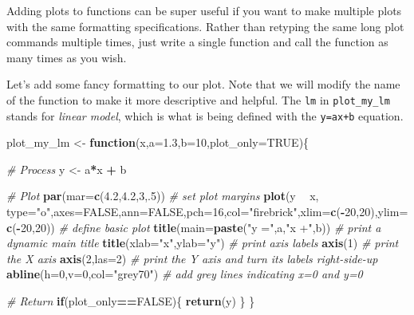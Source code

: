 \documentclass[]{book}
\newenvironment{Shaded}{\begin{snugshade}}{\end{snugshade}}
\newcommand{\CommentTok}[1]{\textcolor[rgb]{0.56,0.35,0.01}{\textit{#1}}}
\newcommand{\ControlFlowTok}[1]{\textcolor[rgb]{0.13,0.29,0.53}{\textbf{#1}}}
\newcommand{\DataTypeTok}[1]{\textcolor[rgb]{0.13,0.29,0.53}{#1}}
\newcommand{\DecValTok}[1]{\textcolor[rgb]{0.00,0.00,0.81}{#1}}
\newcommand{\FloatTok}[1]{\textcolor[rgb]{0.00,0.00,0.81}{#1}}
\newcommand{\KeywordTok}[1]{\textcolor[rgb]{0.13,0.29,0.53}{\textbf{#1}}}
\newcommand{\NormalTok}[1]{#1}
\newcommand{\OperatorTok}[1]{\textcolor[rgb]{0.81,0.36,0.00}{\textbf{#1}}}
\newcommand{\OtherTok}[1]{\textcolor[rgb]{0.56,0.35,0.01}{#1}}
\newcommand{\StringTok}[1]{\textcolor[rgb]{0.31,0.60,0.02}{#1}}
\begin{document}
Adding plots to functions can be super useful if you want to make multiple plots with the same formatting specifications. Rather than retyping the same long plot commands multiple times, just write a single function and call the function as many times as you wish.

Let's add some fancy formatting to our plot. Note that we will modify the name of the function to make it more descriptive and helpful. The \texttt{lm} in \texttt{plot\_my\_lm} stands for \emph{linear model}, which is what is being defined with the \texttt{y=ax+b} equation.

\begin{Shaded}
\begin{Highlighting}[]
\NormalTok{plot_my_lm <-}\StringTok{ }\ControlFlowTok{function}\NormalTok{(x,}\DataTypeTok{a=}\FloatTok{1.3}\NormalTok{,}\DataTypeTok{b=}\DecValTok{10}\NormalTok{,}\DataTypeTok{plot_only=}\OtherTok{TRUE}\NormalTok{)\{}
  
  \CommentTok{# Process}
\NormalTok{  y <-}\StringTok{ }\NormalTok{a}\OperatorTok{*}\NormalTok{x }\OperatorTok{+}\StringTok{ }\NormalTok{b}
  
  \CommentTok{# Plot}
  \KeywordTok{par}\NormalTok{(}\DataTypeTok{mar=}\KeywordTok{c}\NormalTok{(}\FloatTok{4.2}\NormalTok{,}\FloatTok{4.2}\NormalTok{,}\DecValTok{3}\NormalTok{,.}\DecValTok{5}\NormalTok{)) }\CommentTok{# set plot margins}
  \KeywordTok{plot}\NormalTok{(y }\OperatorTok{~}\StringTok{ }\NormalTok{x, }\DataTypeTok{type=}\StringTok{"o"}\NormalTok{,}\DataTypeTok{axes=}\OtherTok{FALSE}\NormalTok{,}\DataTypeTok{ann=}\OtherTok{FALSE}\NormalTok{,}\DataTypeTok{pch=}\DecValTok{16}\NormalTok{,}\DataTypeTok{col=}\StringTok{"firebrick"}\NormalTok{,}\DataTypeTok{xlim=}\KeywordTok{c}\NormalTok{(}\OperatorTok{-}\DecValTok{20}\NormalTok{,}\DecValTok{20}\NormalTok{),}\DataTypeTok{ylim=}\KeywordTok{c}\NormalTok{(}\OperatorTok{-}\DecValTok{20}\NormalTok{,}\DecValTok{20}\NormalTok{)) }\CommentTok{# define basic plot}
  \KeywordTok{title}\NormalTok{(}\DataTypeTok{main=}\KeywordTok{paste}\NormalTok{(}\StringTok{"y ="}\NormalTok{,a,}\StringTok{"x +"}\NormalTok{,b)) }\CommentTok{# print a dynamic main title}
  \KeywordTok{title}\NormalTok{(}\DataTypeTok{xlab=}\StringTok{"x"}\NormalTok{,}\DataTypeTok{ylab=}\StringTok{"y"}\NormalTok{)  }\CommentTok{# print axis labels}
  \KeywordTok{axis}\NormalTok{(}\DecValTok{1}\NormalTok{) }\CommentTok{# print the X axis}
  \KeywordTok{axis}\NormalTok{(}\DecValTok{2}\NormalTok{,}\DataTypeTok{las=}\DecValTok{2}\NormalTok{) }\CommentTok{# print the Y axis and turn its labels right-side-up}
  \KeywordTok{abline}\NormalTok{(}\DataTypeTok{h=}\DecValTok{0}\NormalTok{,}\DataTypeTok{v=}\DecValTok{0}\NormalTok{,}\DataTypeTok{col=}\StringTok{"grey70"}\NormalTok{) }\CommentTok{# add grey lines indicating x=0 and y=0}
  
  \CommentTok{# Return}
  \ControlFlowTok{if}\NormalTok{(plot_only}\OperatorTok{==}\OtherTok{FALSE}\NormalTok{)\{}
    \KeywordTok{return}\NormalTok{(y)}
\NormalTok{  \}}
\NormalTok{\}}
\end{Highlighting}
\end{Shaded}
\end{document}
